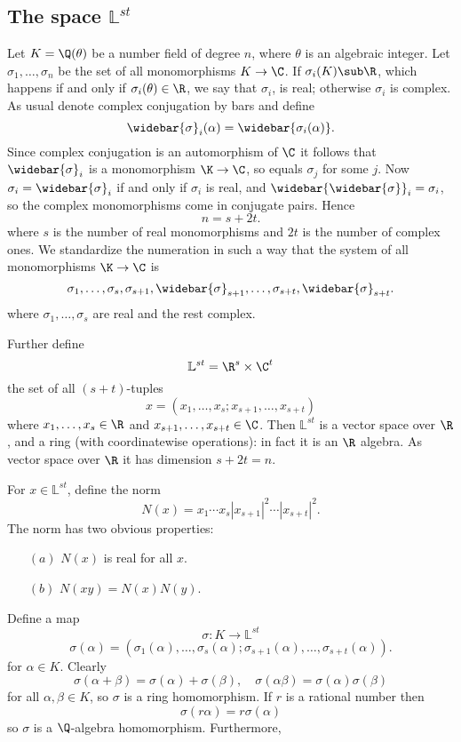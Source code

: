 \subsection{The space \boldmath$\mathbb{L}^{st}$}
Let $K=\Q(\theta)$ be a number field of degree $n$, where $\theta$ is an algebraic integer. Let $\sigma_1,\dots,\sigma_n$ be the set of all monomorphisms $K\to\C$. If $\sigma_i(K)\sub\R$, which happens if and only if $\sigma_i(\theta)\in\R$, we say that $\sigma_i$, is real; otherwise $\sigma_i$ is complex. As usual denote complex conjugation by bars and define
\[\widebar{\sigma}_i(\alpha)=\widebar{\sigma_i(\alpha)}.\]
Since complex conjugation is an automorphism of $\C$ it follows that $\widebar{\sigma}_i$ is a monomorphism $\K\to\C$, so equals $\sigma_j$ for some $j$. Now $\sigma_i=\widebar{\sigma}_i$ if and only if $\sigma_i$ is real, and $\widebar{\widebar{\sigma}}_i=\sigma_i$, so the complex monomorphisms come in conjugate pairs. Hence
\[n=s+2t.\]
where $s$ is the number of real monomorphisms and $2t$ is the number of complex ones. We standardize the numeration in such a way that the system of all monomorphisms $\K\to\C$ is
\[\sigma_1,\dots,\sigma_s,\sigma_{s+1},\widebar{\sigma}_{s+1},\dots,\sigma_{s+t},\widebar{\sigma}_{s+t}.\]
where $\sigma_1,\dots,\sigma_s$ are real and the rest complex.\par
Further define
\[\mathbb{L}^{st}=\R^s\times\C^t\]
the set of all $(s+t)$-tuples
\[x=(x_1,\dots,x_s;x_{s+1},\dots,x_{s+t})\]
where $x_1,\dots,x_s\in\R$ and $x_{s+1},\dots,x_{s+t}\in\C$. Then $\mathbb{L}^{st}$ is a vector space over $\R$, and a ring (with coordinatewise operations): in fact it is an $\R$ algebra. As vector space over $\R$ it has dimension $s+2t=n$.\par
For $x\in\mathbb{L}^{st}$, define the norm
\[N(x)=x_1\cdots x_s|x_{s+1}|^2\cdots|x_{s+t}|^2.\]
The norm has two obvious properties:
\begin{itemize}
\item[$(a)$] $N(x)$ is real for all $x$.
\item[$(b)$] $N(xy)=N(x)N(y)$.
\end{itemize}
Define a map
\[\sigma:K\to\mathbb{L}^{st}\]
\[\sigma(\alpha)=(\sigma_1(\alpha),\dots,\sigma_s(\alpha);\sigma_{s+1}(\alpha),\dots,\sigma_{s+t}(\alpha)).\]
for $\alpha\in K$. Clearly
\[\sigma(\alpha+\beta)=\sigma(\alpha)+\sigma(\beta),\quad\sigma(\alpha\beta)=\sigma(\alpha)\sigma(\beta)\]
for all $\alpha,\beta\in K$, so $\sigma$ is a ring homomorphism. If $r$ is a rational number then
\[\sigma(r\alpha)=r\sigma(\alpha)\]
so $\sigma$ is a $\Q$-algebra homomorphism. Furthermore,
